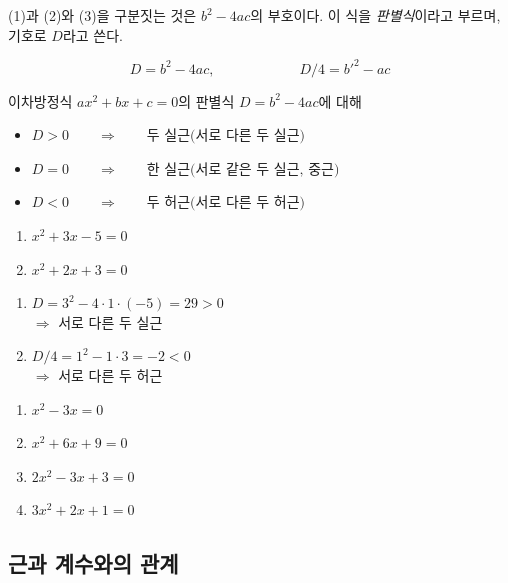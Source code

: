 \documentclass{oblivoir}
\begin{document}
(1)과 (2)와 (3)을 구분짓는 것은 \(b^2-4ac\)의 부호이다.
이 식을 \emph{판별식}이라고 부르며, 기호로 \(D\)라고 쓴다.
\begin{mdframed}[innertopmargin=-2pt,leftmargin=40pt,rightmargin=40pt]
\[D=b^2-4ac,\qquad\qquad\qquad D/4=b'^2-ac\]
\end{mdframed}

\clearpage
%
\begin{mdframed}
이차방정식 \(ax^2+bx+c=0\)의 판별식 \(D=b^2-4ac\)에 대해
\begin{itemize}
\item
\(D>0\qquad\Longrightarrow\qquad\text{두 실근(서로 다른 두 실근)}\)
\item
\(D=0\qquad\Longrightarrow\qquad\text{한 실근(서로 같은 두 실근, 중근)}\)
\item
\(D<0\qquad\Longrightarrow\qquad\text{두 허근(서로 다른 두 허근)}\)
\end{itemize}
\end{mdframed}

%
\begin{enumerate}
\item
\(x^2+3x-5=0\)
\item
\(x^2+2x+3=0\)
\end{enumerate}

\begin{mdframed}
\begin{enumerate}
\item
\(D=3^2-4\cdot1\cdot(-5)=29>0\)\\
\(\Longrightarrow\) 서로 다른 두 실근
\item
\(D/4=1^2-1\cdot3=-2<0\)\\
\(\Longrightarrow\) 서로 다른 두 허근
\end{enumerate}
\end{mdframed}

%
\begin{enumerate}\label{quad5}
\item
\(x^2-3x=0\)
\item
\(x^2+6x+9=0\)
\item
\(2x^2-3x+3=0\)
\item
\(3x^2+2x+1=0\)
\end{enumerate}

\clearpage
\subsection{근과 계수와의 관계}
\end{document}
